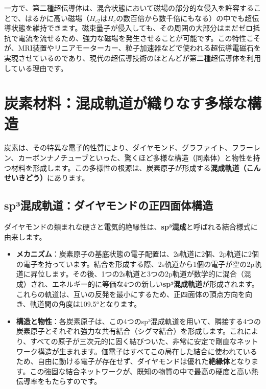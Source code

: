 \documentclass[11pt,a4paper]{ltjsarticle}
\begin{document}
一方で、第二種超伝導体は、混合状態において磁場の部分的な侵入を許容することで、はるかに高い磁場（$H_{c2}$は$H_c$の数百倍から数千倍にもなる）の中でも超伝導状態を維持できます。磁束量子が侵入しても、その周囲の大部分はまだゼロ抵抗で電流を流せるため、強力な磁場を発生させることが可能です。この特性こそが、MRI装置やリニアモーターカー、粒子加速器などで使われる超伝導電磁石を実現させているのであり、現代の超伝導技術のほとんどが第二種超伝導体を利用している理由です。

\section{炭素材料：混成軌道が織りなす多様な構造}
炭素は、その特異な電子的性質により、ダイヤモンド、グラファイト、フラーレン、カーボンナノチューブといった、驚くほど多様な構造（同素体）と物性を持つ材料を形成します。この多様性の根源は、炭素原子が形成する\textbf{混成軌道（こんせいきどう）}にあります。

\subsection{sp³混成軌道：ダイヤモンドの正四面体構造}
ダイヤモンドの類まれな硬さと電気的絶縁性は、\textbf{sp³混成}と呼ばれる結合様式に由来します\cite{ref1}。
\begin{itemize}
    \item \textbf{メカニズム}：炭素原子の基底状態の電子配置は、2s軌道に2個、2p軌道に2個の電子を持っています。結合を形成する際、2s軌道から1個の電子が空の2p軌道に昇位します。その後、1つの2s軌道と3つの2p軌道が数学的に混合（混成）され、エネルギー的に等価な4つの新しい\textbf{sp³混成軌道}が形成されます\cite{ref1}。これらの軌道は、互いの反発を最小にするため、正四面体の頂点方向を向き、軌道間の角度は\ang{109.5}となります\cite{ref1}。
    \item \textbf{構造と物性}：各炭素原子は、この4つのsp³混成軌道を用いて、隣接する4つの炭素原子とそれぞれ強力な共有結合（シグマ結合）を形成します。これにより、すべての原子が三次元的に固く結びついた、非常に安定で剛直なネットワーク構造が生まれます。価電子はすべてこの局在した結合に使われているため、自由に動ける電子が存在せず、ダイヤモンドは優れた\textbf{絶縁体}となります。この強固な結合ネットワークが、既知の物質の中で最高の硬度と高い熱伝導率をもたらすのです\cite{ref1}。
\end{itemize}
\end{document}
